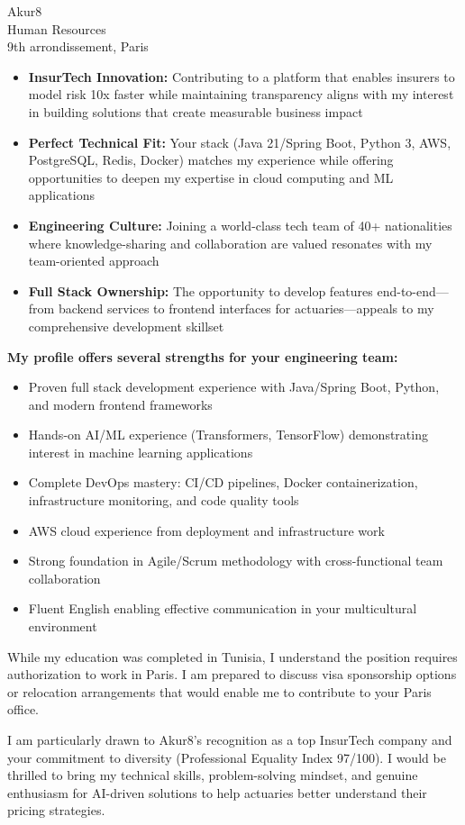 \documentclass[11pt,a4paper]{letter}
\begin{document}
\begin{letter}{
    Akur8 \\
    Human Resources \\
    9th arrondissement, Paris
}
\begin{itemize}
    \item \textbf{InsurTech Innovation:} Contributing to a platform that enables insurers to model risk 10x faster while maintaining transparency aligns with my interest in building solutions that create measurable business impact
    \item \textbf{Perfect Technical Fit:} Your stack (Java 21/Spring Boot, Python 3, AWS, PostgreSQL, Redis, Docker) matches my experience while offering opportunities to deepen my expertise in cloud computing and ML applications
    \item \textbf{Engineering Culture:} Joining a world-class tech team of 40+ nationalities where knowledge-sharing and collaboration are valued resonates with my team-oriented approach
    \item \textbf{Full Stack Ownership:} The opportunity to develop features end-to-end---from backend services to frontend interfaces for actuaries---appeals to my comprehensive development skillset
\end{itemize}

\textbf{My profile offers several strengths for your engineering team:}

\begin{itemize}
    \item Proven full stack development experience with Java/Spring Boot, Python, and modern frontend frameworks
    \item Hands-on AI/ML experience (Transformers, TensorFlow) demonstrating interest in machine learning applications
    \item Complete DevOps mastery: CI/CD pipelines, Docker containerization, infrastructure monitoring, and code quality tools
    \item AWS cloud experience from deployment and infrastructure work
    \item Strong foundation in Agile/Scrum methodology with cross-functional team collaboration
    \item Fluent English enabling effective communication in your multicultural environment
\end{itemize}

While my education was completed in Tunisia, I understand the position requires authorization to work in Paris. I am prepared to discuss visa sponsorship options or relocation arrangements that would enable me to contribute to your Paris office.

I am particularly drawn to Akur8's recognition as a top InsurTech company and your commitment to diversity (Professional Equality Index 97/100). I would be thrilled to bring my technical skills, problem-solving mindset, and genuine enthusiasm for AI-driven solutions to help actuaries better understand their pricing strategies.


\end{letter}
\end{document}

